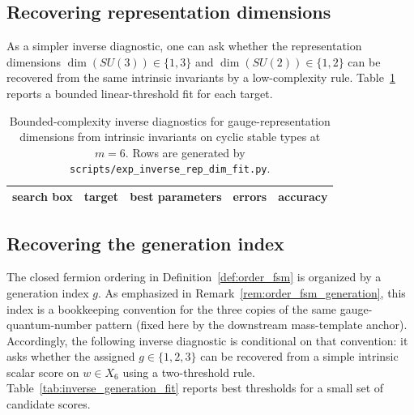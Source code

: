 \begin{table}[H]
\centering
\small
\setlength{\tabcolsep}{6pt}
\renewcommand{\arraystretch}{1.15}
%
\caption{Bounded-complexity inverse diagnostic for the full hypercharge numerator $Y_{\mathrm{num}}=6Y$ from intrinsic invariants on cyclic stable types at $m=6$. Rows are generated by \texttt{scripts/exp\_inverse\_hypercharge\_full\_fit.py}.}
\label{tab:inverse_hypercharge_full_fit}
\end{table}

\subsection{Recovering representation dimensions}

As a simpler inverse diagnostic, one can ask whether the representation dimensions $\dim(SU(3))\in\{1,3\}$ and $\dim(SU(2))\in\{1,2\}$ can be recovered from the same intrinsic invariants by a low-complexity rule.
Table~\ref{tab:inverse_rep_dim_fit} reports a bounded linear-threshold fit for each target.

\begin{table}[H]
\centering
\small
\setlength{\tabcolsep}{6pt}
\renewcommand{\arraystretch}{1.15}
\begin{tabular}{l l l r r}
\toprule
search box & target & best parameters & errors & accuracy \\
\midrule
%
\end{tabular}
\caption{Bounded-complexity inverse diagnostics for gauge-representation dimensions from intrinsic invariants on cyclic stable types at $m=6$. Rows are generated by \texttt{scripts/exp\_inverse\_rep\_dim\_fit.py}.}
\label{tab:inverse_rep_dim_fit}
\end{table}

\subsection{Recovering the generation index}

The closed fermion ordering in Definition~\ref{def:order_fsm} is organized by a generation index $g$.
As emphasized in Remark~\ref{rem:order_fsm_generation}, this index is a bookkeeping convention for the three copies of the same gauge-quantum-number pattern (fixed here by the downstream mass-template anchor).
Accordingly, the following inverse diagnostic is conditional on that convention: it asks whether the assigned $g\in\{1,2,3\}$ can be recovered from a simple intrinsic scalar score on $w\in X_6$ using a two-threshold rule.
Table~\ref{tab:inverse_generation_fit} reports best thresholds for a small set of candidate scores.

